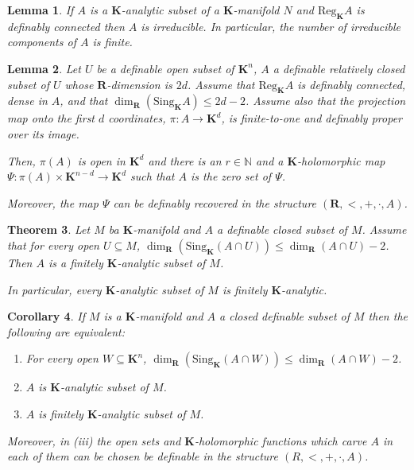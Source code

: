 \documentclass{amsart}
\newtheorem{theorem}{Theorem}[subsection]
\newtheorem{lemma}[theorem]{Lemma}
\newtheorem{corollary}[theorem]{Corollary}
\theoremstyle{definition}
\numberwithin{equation}{section}
\begin{document}
\begin{lemma}
	If $A$ is a $\mathbf{K}$-analytic subset of a $\mathbf{K}$-manifold $N$ and $\mathrm{Reg}_{\mathbf{K}}A$ is definably connected then $A$ is irreducible.
	In particular, the number of irreducible components of $A$ is finite.
\end{lemma}

\begin{lemma}
	Let $U$ be a definable open subset of $\mathbf{K}^n$,
	$A$ a definable relatively closed subset of $U$
	whose $\mathbf{R}$-dimension is $2d$.
	Assume that $\mathrm{Reg}_{\mathbf{K}}A$ is definably connected,
	dense in $A$, and that $\dim_{\mathbf{R}}(\mathrm{Sing}_{\mathbf{K}}A) \le 2d-2$.
	Assume also that the projection map onto the first $d$ coordinates,
	$\pi : A \to \mathbf{K}^d$,
	is finite-to-one and definably proper over its image.

	Then, $\pi(A)$ is open in $\mathbf{K}^d$ and there is an $r\in \mathbb{N}$ and a $\mathbf{K}$-holomorphic map
	$\Psi: \pi(A) \times \mathbf{K}^{n-d} \to \mathbf{K}^d$ such that $A$ is the zero set of $\Psi$.

	Moreover, the map $\Psi$ can be definably recovered in the structure $(\mathbf{R},<,+,\cdot,A)$.
\end{lemma}

\begin{tcolorbox}
	\begin{theorem}
		Let $M$ ba $\mathbf{K}$-manifold and $A$ a definable closed subset of $M$.
		Assume that for every open $U \subseteq M$,
		$\dim_{\mathbf{R}}(\mathrm{Sing}_{\mathbf{K}}(A\cap U)) \le \dim_{\mathbf{R}}(A\cap U) -2$.
		Then $A$ is a finitely $\mathbf{K}$-analytic subset of $M$.

		In particular, every $\mathbf{K}$-analytic subset of $M$ is finitely $\mathbf{K}$-analytic.
	\end{theorem}
\end{tcolorbox}

\begin{corollary}
	If $M$ is a $\mathbf{K}$-manifold and $A$ a closed definable subset of $M$ then the following are equivalent:
	\begin{enumerate}[label = (\roman*)]
		\item For every open $W \subseteq \mathbf{K}^n$, $\dim_{\mathbf{R}}(\mathrm{Sing}_{\mathbf{K}}(A\cap W)) \le \dim_{\mathbf{R}}(A\cap W) -2$.
		\item $A$ is $\mathbf{K}$-analytic subset of $M$.
		\item $A$ is finitely $\mathbf{K}$-analytic subset of $M$.
	\end{enumerate}
	Moreover, in (iii) the open sets and $\mathbf{K}$-holomorphic functions which carve $A$ in each of them can be chosen be definable in the structure $(R,<,+,\cdot,A)$.
\end{corollary}
\end{document}

